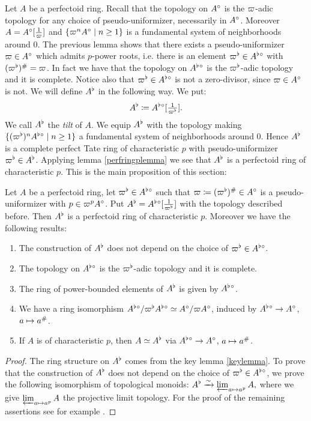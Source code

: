 Let $A$ be a perfectoid ring. 
Recall that the topology on $A{^{\circ}}$ is the $\varpi$-adic topology for any choice of pseudo-uniformizer, necessarily in $A{^{\circ}}$.
Moreover $A=A{^{\circ}}[\tfrac{1}{\varpi}]$ and $\{\varpi^nA{^{\circ}}\mid n\geq 1\}$ is a fundamental system of neighborhoods around $0$.
The previous lemma shows that there exists a pseudo-uniformizer $\varpi\in A{^{\circ}}$ which admits $p$-power roots, i.e. there is an element
$\varpi^{\flat}\in A^{\flat}{^{\circ}}$ with $(\varpi^{\flat})^{\#}=\varpi$.
In fact we have that the topology on $A^{\flat}{^{\circ}}$ is the $\varpi^{\flat}$-adic topology and it is complete.
Notice also that $\varpi^{\flat}\in A^{\flat}{^{\circ}}$ is not a zero-divisor, since $\varpi\in A{^{\circ}}$ is not.
We will define $A^{\flat}$ in the following way.
We put:
\[A^{\flat}\coloneqq A^{\flat}{^{\circ}}[\tfrac{1}{\varpi^{\flat}}].\]
We call $A^{\flat}$ the \textit{tilt} of $A$.
We equip $A^{\flat}$ with the topology making $\{(\varpi^{\flat})^nA^{\flat}{^{\circ}}\mid n\geq 1\}$ a fundamental system of neighborhoods around $0$.
Hence $A^{\flat}$ is a complete perfect Tate ring of characteristic $p$ with pseudo-uniformizer $\varpi^{\flat}\in A^{\flat}$.
Applying lemma \ref{perfringplemma} we see that $A^{\flat}$ is a perfectoid ring of characteristic $p$. This is the main proposition of this section:

\begin{prop}
Let $A$ be a perfectoid ring, let $\varpi^{\flat}\in A^{\flat}{^{\circ}}$ such that $\varpi\coloneqq(\varpi^{\flat})^{\#}\in A{^{\circ}}$ is a pseudo-uniformizer with $p\in\varpi^pA{^{\circ}}$.
Put $A^{\flat}= A^{\flat}{^{\circ}}[\tfrac{1}{\varpi^{\flat}}]$ with the topology described before.
Then $A^{\flat}$ is a perfectoid ring of characteristic $p$. Moreover we have the following results:
\begin{enumerate}
\item The construction of $A^{\flat}$ does not depend on the choice of $\varpi^{\flat}\in A^{\flat}{^{\circ}}$.
\item The topology on $A^{\flat}{^{\circ}}$ is the $\varpi^{\flat}$-adic topology and it is  complete.
\item The ring of power-bounded elements of $A^{\flat}$ is given by $A^{\flat}{^{\circ}}$.
\item We have a ring  isomorphism
	$A^{\flat}{^{\circ}}/\varpi^{\flat} A^{\flat}{^{\circ}}\simeq A{^{\circ}}/\varpi A{^{\circ}}$, 
	induced by $A^{\flat}{^{\circ}}\to A{^{\circ}}$, $a\mapsto a^{\#}$.
\item If $A$ is of characteristic $p$, then $A\simeq A^{\flat}$ via $A^{\flat}{^{\circ}}\to A{^{\circ}}$, $a\mapsto a^{\#}$.
\end{enumerate}
\end{prop}
\begin{proof}
The ring structure on $A^{\flat}$ comes from the key lemma \ref{keylemma}.
To prove that the construction of $A^{\flat}$ does not depend on the choice of $\varpi^{\flat}\in A^{\flat}{^{\circ}}$, we prove the following isomorphism of topological monoids:
$A^{\flat}\xrightarrow{\sim}\varprojlim_{a\mapsto a^p}A,$ 
where we give $\varprojlim_{a\mapsto a^p}A$ the projective limit topology.
 For the proof of the remaining assertions see for example \cite[proposition V.1.2.1]{Morel19}.
\end{proof}



